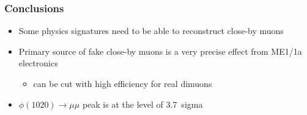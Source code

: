 \documentclass[compress]{beamer}
\begin{document}
\begin{frame}
\frametitle{Conclusions}

\begin{itemize}\setlength{\itemsep}{0.5 cm}
\item Some physics signatures need to be able to reconstruct close-by muons

\item Primary source of fake close-by muons is a very precise effect from ME1/1a electronics
\begin{itemize}
\item can be cut with high efficiency for real dimuons
\end{itemize}

\item $\phi(1020) \to \mu\mu$ peak is at the level of 3.7~sigma
\end{itemize}

\label{numpages}
\end{frame}
\end{document}
